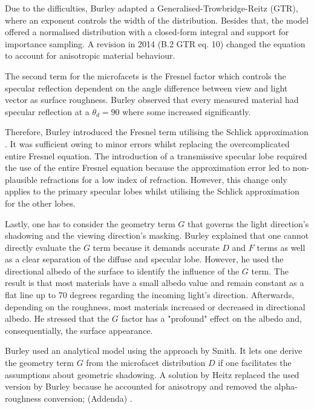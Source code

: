 Due to the difficulties, Burley adapted a Generalised-Trowbridge-Reitz (GTR), where an exponent controls the width of the distribution.
Besides that, the model offered a normalised distribution with a closed-form integral and support for importance sampling.
A revision in 2014 (B.2 GTR eq. 10) \cite{burley_physically_2012} changed the equation to account for anisotropic material behaviour.

The second term for the microfacets is the Fresnel factor which controls the specular reflection dependent on the angle difference between view and light vector as surface roughness.
Burley observed that every measured material had specular reflection at a $\theta_d=90$ where some increased significantly.

Therefore, Burley \cite{burley_physically_2012} introduced the Fresnel term utilising the Schlick approximation \cite{schlick_inexpensive_1994}.
It was sufficient owing to minor errors whilst replacing the overcomplicated entire Fresnel equation.
The introduction of a transmissive specular lobe \cite{burley_extending_2015} required the use of the entire Fresnel equation because the approximation error led to non-plausible refractions for a low index of refraction.
However, this change only applies to the primary specular lobes whilst utilising the Schlick approximation for the other lobes.

Lastly, one has to consider the geometry term $G$ that governs the light direction's shadowing and the viewing direction's masking.
Burley explained \cite{burley_physically_2012} that one cannot directly evaluate the $G$ term because it demands accurate $D$ and $F$ terms as well as a clear separation of the diffuse and specular lobe.
However, he used the directional albedo of the surface to identify the influence of the $G$ term.
The result is that most materials have a small albedo value and remain constant as a flat line up to 70 degrees regarding the incoming light's direction.
Afterwards, depending on the roughness, most materials increased or decreased in directional albedo.
He stressed that the $G$ factor has a "profound" effect on the albedo and, consequentially, the surface appearance.

Burley used an analytical model using the approach by Smith.
It lets one derive the geometry term $G$ from the microfacet distribution $D$ if one facilitates the assumptions about geometric shadowing.
A solution by Heitz \cite{heitz_understanding_2014} replaced the used version by Burley because he accounted for anisotropy and removed the alpha-roughness conversion; (Addenda) \cite{burley_physically_2012}.


